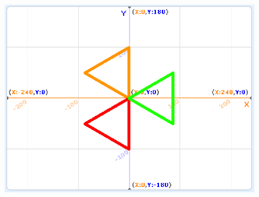 \documentclass[10pt, a4paper]{article}
\begin{document}
\begin{enumerate}
        \begin{figure}[htbp]
            \centering
            \includegraphics[width=.4\textwidth]{figure/37.png}
        \end{figure}
    \end{enumerate}
\end{document}
